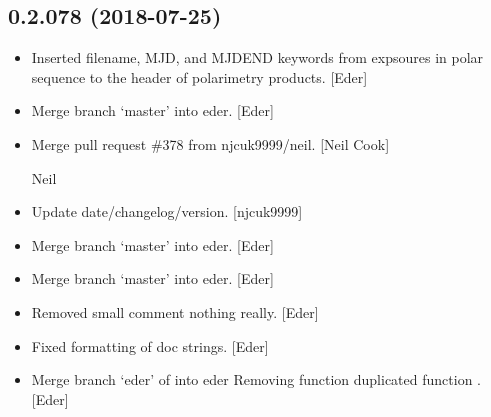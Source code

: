 \documentclass[a4paper,10pt,english]{report}
\begin{document}
\subsection{0.2.078 (2018-07-25)}
\label{\detokenize{misc/changelog:id385}}\begin{itemize}
\item {} 
Inserted filename, MJD, and MJDEND keywords from expsoures in polar
sequence to the header of polarimetry products. {[}Eder{]}

\item {} 
Merge branch ‘master’ into eder. {[}Eder{]}

\item {} 
Merge pull request \#378 from njcuk9999/neil. {[}Neil Cook{]}

Neil

\item {} 
Update date/changelog/version. {[}njcuk9999{]}

\item {} 
Merge branch ‘master’ into eder. {[}Eder{]}

\item {} 
Merge branch ‘master’ into eder. {[}Eder{]}

\item {} 
Removed small comment \textendash{} nothing really. {[}Eder{]}

\item {} 
Fixed formatting of doc strings. {[}Eder{]}

\item {} 
Merge branch ‘eder’ of  into
eder Removing function duplicated function . {[}Eder{]}

\end{itemize}
\end{document}
